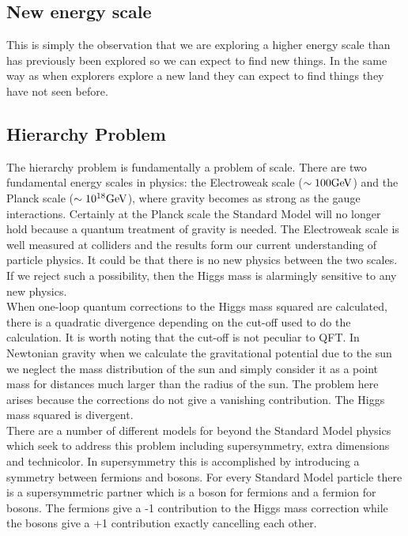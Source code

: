 \subsection{New energy scale}

This is simply the observation that we are exploring a higher energy scale than
has previously been explored so we can expect to find new things. In the same
way as when explorers explore a new land they can expect to find things they
have not seen before.

\subsection{Hierarchy Problem}

The hierarchy problem is fundamentally a problem of scale. There are two
fundamental energy scales in physics: the Electroweak scale ($\sim100\mbox{GeV}$) and
the Planck scale ($\sim10^{18}\mbox{GeV}$), where gravity becomes as strong as the 
gauge interactions. Certainly at the Planck scale the Standard Model will no
longer hold because a quantum treatment of gravity is needed. The Electroweak 
scale is well measured at colliders and the results form our current 
understanding of particle physics. It could be that there is no new physics 
between the two scales. If we reject such a possibility, then the Higgs mass is
alarmingly sensitive to any new physics. \\

When one-loop quantum corrections to the Higgs mass squared are calculated, 
there is a quadratic divergence depending on the cut-off used to do the
calculation. It is worth noting that the cut-off is not peculiar to QFT. In
Newtonian gravity when we calculate the gravitational potential due to the sun
we neglect the mass distribution of the sun and simply consider it as a point
mass for distances much larger than the radius of the sun. The problem here
arises because the corrections do not give a vanishing contribution. The Higgs
mass squared is divergent. \\

There are a number of different models for beyond the Standard Model physics 
which seek to address this problem including supersymmetry, extra dimensions 
and technicolor. In supersymmetry this is accomplished by introducing a symmetry
between fermions and bosons. For every Standard Model particle there is a 
supersymmetric partner which is a boson for fermions and a fermion for bosons. 
The fermions give a -1 contribution to the Higgs mass correction while the 
bosons give a +1 contribution exactly cancelling each other.

